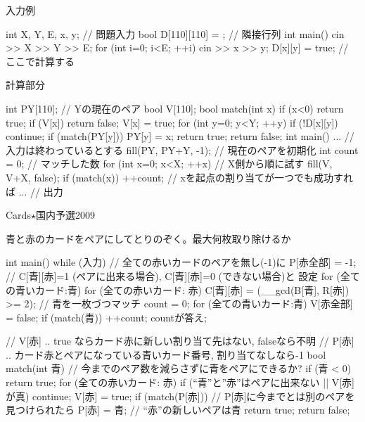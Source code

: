 \begin{versionalpha}
入力例
\begin{cbox}
int X, Y, E, x, y; // 問題入力
bool D[110][110] = {}; // 隣接行列
int main() {
  cin >> X >> Y >> E;
  for (int i=0; i<E; ++i) {
    cin >> x >> y;
    D[x][y] = true;
  }
  // ここで計算する
}
\end{cbox}

計算部分
\begin{cbox}
int PY[110]; // Yの現在のペア
bool V[110];
bool match(int x) {
  if (x<0) return true;
  if (V[x]) return false;
  V[x] = true;
  for (int y=0; y<Y; ++y) {
    if (!D[x][y]) continue;
    if (match(PY[y])) {
      PY[y] = x;
      return true;
    }
  }
  return false;
}
int main() {
  ... // 入力は終わっているとする
  fill(PY, PY+Y, -1); // 現在のペアを初期化
  int count = 0; // マッチした数
  for (int x=0; x<X; ++x) { // X側から順に試す
    fill(V, V+X, false);
    if (match(x)) ++count; // xを起点の割り当てが一つでも成功すれば
  }
  ... // 出力
}
\end{cbox}

\begin{pbox}{Cards$\star$}{国内予選2009}

青と赤のカードをペアにしてとりのぞく。最大何枚取り除けるか  

\end{pbox}

\begin{cbox}
int main() {
    while (入力) {
       // 全ての赤いカードのペアを無し(-1)に
       P[赤全部] = -1;
       // C[青][赤]=1 (ペアに出来る場合), C[青][赤]=0 (できない場合)と
       設定
       for (全ての青いカード:青)
           for (全ての赤いカード: 赤)
               C[青][赤] = (__gcd(B[青], R[赤]) >= 2);
       // 青を一枚づつマッチ
       count = 0;
       for (全ての青いカード:青) {
           V[赤全部] = false;
           if (match(青)) ++count;
       }
       countが答え;
    }
}
\end{cbox}

\begin{cbox}
// V[赤] .. true ならカード赤に新しい割り当て先はない, falseなら不明
// P[赤] .. カード赤とペアになっている青いカード番号, 割り当てなしなら-1
bool match(int 青) { // 今までのペア数を減らさずに青をペアにできるか?
    if (青 < 0) return true;
    for (全ての赤いカード: 赤) {
       if (``青''と''赤''はペアに出来ない || V[赤]が真) continue;
       V[赤] = true;
       if (match(P[赤])) { // P[赤]に今までとは別のペアを見つけられたら
         P[赤] = 青; // ``赤''の新しいペアは青
         return true;
       }
    }
    return false;
}
\end{cbox}


\end{versionalpha}
